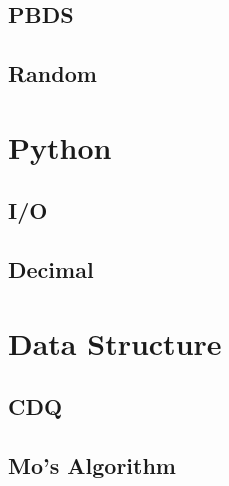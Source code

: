 \documentclass[a4paper,10pt,twocolumn,oneside]{article}
\begin{document}
% 

\subsection{PBDS}


\subsection{Random}


\section{Python}
\subsection{I/O}


\subsection{Decimal}




\section{Data Structure}

\subsection{CDQ}


\subsection{Mo's Algorithm}


% 
\end{document}
